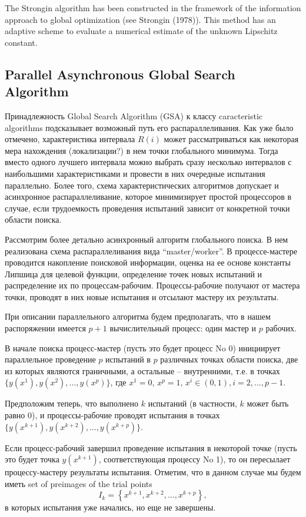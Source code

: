 \documentclass{svproc}
\begin{document}
The Strongin algorithm has been constructed in the framework of the information approach to global optimization (see Strongin (1978)). This method has an adaptive scheme to evaluate a numerical estimate of the unknown Lipschitz constant.


\subsection{Parallel Asynchronous Global Search Algorithm}

Принадлежность Global Search Algorithm (GSA) к классу caracteristic algorithms подсказывает возможный путь его распараллеливания. 
Как уже было отмечено, характеристика интервала $R(i)$ может рассматриваться как некоторая мера нахождения (локализации?) в нем точки глобального минимума. 
Тогда вместо одного лучшего интервала можно выбрать сразу несколько интервалов с наибольшими характеристиками и провести в них очередные испытания параллельно.
Более того, схема характеристических алгоритмов допускает и асинхронное распараллеливание, которое минимизирует простой процессоров в случае, если трудоемкость проведения испытаний зависит от конкретной точки области поиска. 

Рассмотрим более детально асинхронный алгоритм глобального поиска. В нем реализована схема распараллеливания вида ``master/worker''. В процессе-мастере проводится накопление поисковой информации, оценка на ее основе константы Липшица для целевой функции, определение точек новых испытаний и распределение их по процессам-рабочим. Процессы-рабочие получают от мастера точки, проводят в них новые испытания и отсылают мастеру их результаты. 

При описании параллельного алгоритма будем предполагать, что в нашем распоряжении имеется $p+1$ вычислительный процесс: один мастер и $p$ рабочих.
 
В начале поиска процесс-мастер (пусть это будет процесс No 0) инициирует параллельное проведение $p$ испытаний в $p$ различных точках области поиска, две из которых являются граничными, а остальные -- внутренними, т.е. в точках $\{y(x^1), y(x^2), ...,y(x^p)\}$, где $x^1 = 0$, $x^p = 1$, $x^i\in(0,1), i=2,..., p-1$.

Предположим теперь, что выполнено $k$ испытаний (в частности, $k$ может быть равно 0), и процессы-рабочие проводят испытания в точках $\{y(x^{k+1}), y(x^{k+2}), ...,y(x^{k+p})\}$. 

Если процесс-рабочий завершил проведение испытания в некоторой точке (пусть это будет точка $y(x^{k+1})$, соответствующая процессу No 1), то он пересылает процессу-мастеру результаты испытания. 
Отметим, что в данном случае мы будем иметь set of preimages of the trial points
\[
I_k = \left\{ x^{k+1},x^{k+2},...,x^{k+p} \right\},
\]
в которых испытания уже начались, но еще не завершены.
\end{document}
